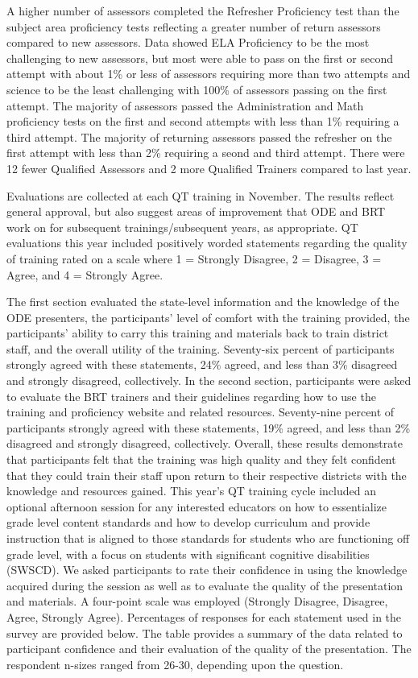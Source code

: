 \documentclass[]{article}
\begin{document}
A higher number of assessors completed the Refresher Proficiency test
than the subject area proficiency tests reflecting a greater number of
return assessors compared to new assessors. Data showed ELA Proficiency
to be the most challenging to new assessors, but most were able to pass
on the first or second attempt with about 1\% or less of assessors
requiring more than two attempts and science to be the least challenging
with 100\% of assessors passing on the first attempt. The majority of
assessors passed the Administration and Math proficiency tests on the
first and second attempts with less than 1\% requiring a third attempt.
The majority of returning assessors passed the refresher on the first
attempt with less than 2\% requiring a seond and third attempt. There
were 12 fewer Qualified Assessors and 2 more Qualified Trainers compared
to last year.

Evaluations are collected at each QT training in November. The results
reflect general approval, but also suggest areas of improvement that ODE
and BRT work on for subsequent trainings/subsequent years, as
appropriate. QT evaluations this year included positively worded
statements regarding the quality of training rated on a scale where 1 =
Strongly Disagree, 2 = Disagree, 3 = Agree, and 4 = Strongly Agree.

The first section evaluated the state-level information and the
knowledge of the ODE presenters, the participants' level of comfort with
the training provided, the participants' ability to carry this training
and materials back to train district staff, and the overall utility of
the training. Seventy-six percent of participants strongly agreed with
these statements, 24\% agreed, and less than 3\% disagreed and strongly
disagreed, collectively. In the second section, participants were asked
to evaluate the BRT trainers and their guidelines regarding how to use
the training and proficiency website and related resources. Seventy-nine
percent of participants strongly agreed with these statements, 19\%
agreed, and less than 2\% disagreed and strongly disagreed,
collectively. Overall, these results demonstrate that participants felt
that the training was high quality and they felt confident that they
could train their staff upon return to their respective districts with
the knowledge and resources gained. This year's QT training cycle
included an optional afternoon session for any interested educators on
how to essentialize grade level content standards and how to develop
curriculum and provide instruction that is aligned to those standards
for students who are functioning off grade level, with a focus on
students with significant cognitive disabilities (SWSCD). We asked
participants to rate their confidence in using the knowledge acquired
during the session as well as to evaluate the quality of the
presentation and materials. A four-point scale was employed (Strongly
Disagree, Disagree, Agree, Strongly Agree). Percentages of responses for
each statement used in the survey are provided below. The table provides
a summary of the data related to participant confidence and their
evaluation of the quality of the presentation. The respondent n-sizes
ranged from 26-30, depending upon the question.
\end{document}
